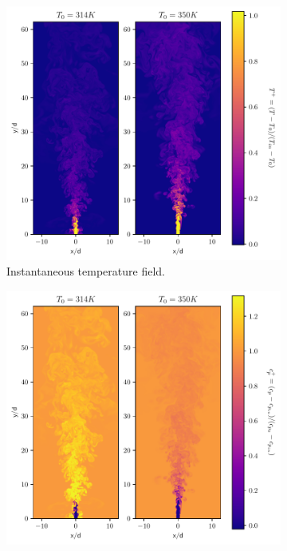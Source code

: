 \begin{figure}[H]
\begin{subfigure}{0.5\textwidth}
	\centering
	\includegraphics[scale=.45]{figures/Plots/vertical/temp_scaled_vert_noniso.pdf}
	\caption{Instantaneous temperature field.} \label{noniso_temp_1}
\end{subfigure}
\hfill
\begin{subfigure}{0.5\textwidth}
	\centering
	\includegraphics[scale=.45]{figures/Plots/vertical/cp_scaled_vert_noniso.pdf}

\end{subfigure}
\end{figure}
